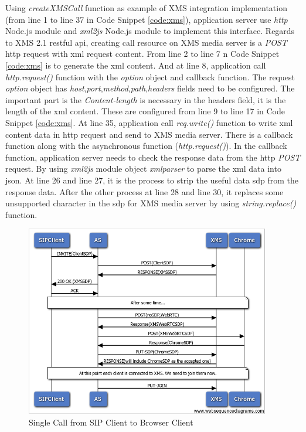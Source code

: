 \par Using \textit{createXMSCall} function as example of XMS integration implementation (from line 1 to line 37 in Code Snippet \ref{code:xms}), application server use \textit{http} Node.js module and \textit{xml2js} Node.js module to implement this interface. Regards to XMS 2.1 \gls{rest}ful \gls{api}, creating call resource on XMS media server is a \textit{POST} \gls{http} request with \gls{xml} request content. From line 2 to line 7 n Code Snippet \ref{code:xms} is to generate the \gls{xml} content. And at line 8, application call \textit{http.request()} function with the \textit{option} object and callback function. The request \textit{option} object has \textit{host},\textit{port},\textit{method},\textit{path},\textit{headers} fields need to be configured. The important part is the \textit{Content-length} is necessary in the headers field, it is the length of the \gls{xml} content. These are configured from line 9 to line 17 in Code Snippet \ref{code:xms}. At line 35, application call \textit{req.write()} function to write \gls{xml} content data in \gls{http} request and send to XMS media server. There is a callback function along with the asynchronous function (\textit{http.request()}). In the callback function, application server needs to check the response data from the \gls{http} \textit{POST} request. By using \textit{xml2js} module object \textit{xmlparser} to parse the \gls{xml} data into \gls{json}. At line 26 and line 27, it is the process to strip the useful data \gls{sdp} from the response data. After the other process at line 28 and line 30, it replaces some unsupported character in the \gls{sdp} for XMS media server by using \textit{string.replace()} function.

\begin{figure}
	\centering
    	\includegraphics[width=0.95\textwidth,natwidth=610,natheight=642]{figs/sip2xms.png}
  	\caption{Single Call from SIP Client to Browser Client}
  	\label{fig:sip2xms}
\end{figure}

